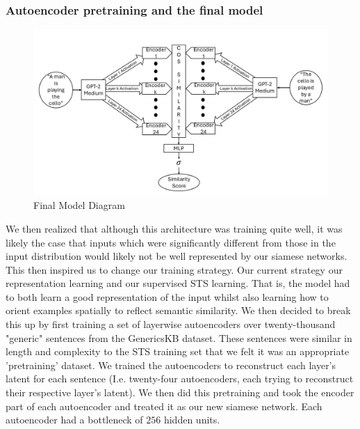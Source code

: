\documentclass{article}
\begin{document}
\subsubsection{Autoencoder pretraining and the final model}
\begin{figure}
    \centering
    \includegraphics[width=1\linewidth]{model-diagram.jpg}
    \caption{Final Model Diagram}
    \label{fig:model-diagram}
\end{figure}

We then realized that although this architecture was training quite well, it was likely the case that inputs which were significantly different from those in the input distribution would likely not be well represented by our siamese networks. This then inspired us to change our training strategy. Our current strategy  our representation learning and our supervised STS learning. That is, the model had to both learn a good representation of the input whilst also learning how to orient examples spatially to reflect semantic similarity. We then decided to break this up by first training a set of layerwise autoencoders over twenty-thousand "generic" sentences from the GenericsKB \cite{bhakthavatsalam2020genericskbknowledgebasegeneric} dataset. These sentences were similar in length and complexity to the STS training set that we felt it was an appropriate 'pretraining' dataset. We trained the autoencoders to reconstruct each layer's latent for each sentence (I.e. twenty-four autoencoders, each trying to reconstruct their respective layer's latent). We then did this pretraining and took the encoder part of each autoencoder and treated it as our new siamese network. Each autoencoder had a bottleneck of $256$ hidden units.
\end{document}
